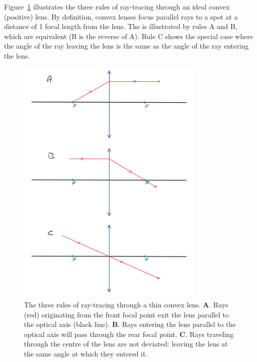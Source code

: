\documentclass[a4paper]{report}
\begin{document}
     Figure~\ref{fig:raytracerules} illustrates the three rules of ray-tracing through an ideal convex (positive) lens.
     By definition, convex lenses focus parallel rays to a spot at a distance of 1 focal length from the lens.
     The is illustrated by rules A and B, which are equivalent (B is the reverse of A).
     Rule C shows the special case where the angle of the ray leaving the lens is the same as the angle of the ray entering the lens.


	\begin{figure}[h]
		\center
		\includegraphics[width=0.8\textwidth]{figures/ray_trace_rules.png}
		\captionsetup{width=0.95\textwidth}
		\caption{The three rules of ray-tracing through a thin convex lens.
		\textbf{A}. Rays (red) originating from the front focal point exit the lens parallel to the optical axis (black line).
		\textbf{B}. Rays entering the lens parallel to the optical axis will pass through the rear focal point.
		\textbf{C}. Rays traveling through the centre of the lens are not deviated: leaving the lens at the same angle at which they entered it.
		}
		\label{fig:raytracerules}
	\end{figure}

	\clearpage
\end{document}
